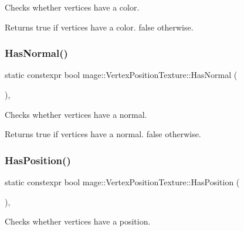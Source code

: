 Checks whether vertices have a color.

\begin{DoxyReturn}{Returns}
{\ttfamily true} if vertices have a color. {\ttfamily false} otherwise. 
\end{DoxyReturn}
\hypertarget{structmage_1_1_vertex_position_texture_a0b50c61258a2778faf9141a916e6b4d0}{}\label{structmage_1_1_vertex_position_texture_a0b50c61258a2778faf9141a916e6b4d0} 
\subsubsection{\texorpdfstring{Has\+Normal()}{HasNormal()}}
{\footnotesize\ttfamily static constexpr bool mage\+::\+Vertex\+Position\+Texture\+::\+Has\+Normal (\begin{DoxyParamCaption}{ }\end{DoxyParamCaption})\hspace{0.3cm}{\ttfamily [static]}, {\ttfamily [noexcept]}}

Checks whether vertices have a normal.

\begin{DoxyReturn}{Returns}
{\ttfamily true} if vertices have a normal. {\ttfamily false} otherwise. 
\end{DoxyReturn}
\hypertarget{structmage_1_1_vertex_position_texture_a73b976c9cf9259da522a84ab4075db78}{}\label{structmage_1_1_vertex_position_texture_a73b976c9cf9259da522a84ab4075db78} 
\subsubsection{\texorpdfstring{Has\+Position()}{HasPosition()}}
{\footnotesize\ttfamily static constexpr bool mage\+::\+Vertex\+Position\+Texture\+::\+Has\+Position (\begin{DoxyParamCaption}{ }\end{DoxyParamCaption})\hspace{0.3cm}{\ttfamily [static]}, {\ttfamily [noexcept]}}

Checks whether vertices have a position.

